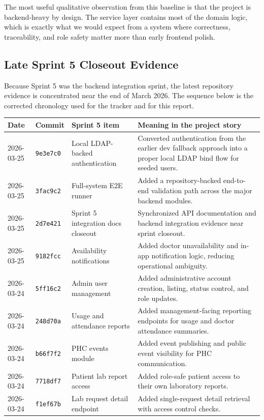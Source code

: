 \documentclass[11pt,a4paper]{article}
\begin{document}
The most useful qualitative observation from this baseline is that the project is backend-heavy by design. The service layer contains most of the domain logic, which is exactly what we would expect from a system where correctness, traceability, and role safety matter more than early frontend polish.

\subsection{Late Sprint 5 Closeout Evidence}
Because Sprint 5 was the backend integration sprint, the latest repository evidence is concentrated near the end of March 2026. The sequence below is the corrected chronology used for the tracker and for this report.

\begin{center}
\begin{tabular}{|p{1.9cm}|p{2cm}|p{4.1cm}|p{6.7cm}|}
\hline
\rowcolor{SoftBlue}
\textbf{Date} & \textbf{Commit} & \textbf{Sprint 5 item} & \textbf{Meaning in the project story} \\
\hline
2026-03-25 & \texttt{9e3e7c0} & Local LDAP-backed authentication & Converted authentication from the earlier dev fallback approach into a proper local LDAP bind flow for seeded users. \\
\hline
2026-03-25 & \texttt{3fac9c2} & Full-system E2E runner & Added a repository-backed end-to-end validation path across the major backend modules. \\
\hline
2026-03-25 & \texttt{2d7e421} & Sprint 5 integration docs closeout & Synchronized API documentation and backend integration evidence near sprint closeout. \\
\hline
2026-03-25 & \texttt{9182fcc} & Availability notifications & Added doctor unavailability and in-app notification logic, reducing operational ambiguity. \\
\hline
2026-03-24 & \texttt{5ff16c2} & Admin user management & Added administrative account creation, listing, status control, and role updates. \\
\hline
2026-03-24 & \texttt{248d70a} & Usage and attendance reports & Added management-facing reporting endpoints for usage and doctor attendance summaries. \\
\hline
2026-03-24 & \texttt{b66f7f2} & PHC events module & Added event publishing and public event visibility for PHC communication. \\
\hline
2026-03-24 & \texttt{7718df7} & Patient lab report access & Added role-safe patient access to their own laboratory reports. \\
\hline
2026-03-24 & \texttt{f1ef67b} & Lab request detail endpoint & Added single-request detail retrieval with access control checks. \\
\hline
\end{tabular}
\end{center}
\end{document}
